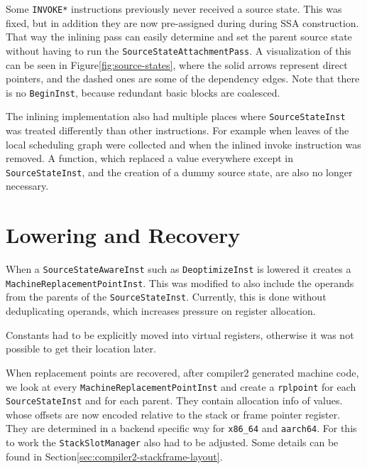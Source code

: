\documentclass[draft,final]{vutinfth} %
\begin{document}
    Some \lstinline{INVOKE*} instructions previously never received a source state.
    This was fixed,
    but in addition they are now pre-assigned during during SSA construction.
    That way the inlining pass can easily determine and set the parent source state
    without having to run the \lstinline{SourceStateAttachmentPass}.
    A visualization of this can be seen in Figure\ref{fig:source-states},
    where the solid arrows represent direct pointers,
    and the dashed ones are some of the dependency edges.
    Note that there is no \lstinline{BeginInst}, because redundant basic blocks are coalesced.


    The inlining implementation also had multiple places where \lstinline{SourceStateInst} was treated differently than other instructions.
    For example when leaves of the local scheduling graph were collected
    and when the inlined invoke instruction was removed.
    A function,
    which replaced a value everywhere except in \lstinline{SourceStateInst},
    and the creation of a dummy source state,
    are also no longer necessary.


    \section{Lowering and Recovery}

    When a \lstinline{SourceStateAwareInst} such as \lstinline{DeoptimizeInst} is lowered
    it creates a \lstinline{MachineReplacementPointInst}.
    This was modified to also include the operands from the parents of the \lstinline{SourceStateInst}.
    Currently, this is done without deduplicating operands,
    which increases pressure on register allocation.

    Constants had to be explicitly moved into virtual registers,
    otherwise it was not possible to get their location later.

    When replacement points are recovered,
    after compiler2 generated machine code,
    we look at every \lstinline{MachineReplacementPointInst}
    and create a \lstinline{rplpoint} for each \lstinline{SourceStateInst} and for each parent.
    They contain allocation info of values.
    whose offsets are now encoded relative to the stack or frame pointer
    register.
    They are determined in a backend specific way for \texttt{x86\_64} and \texttt{aarch64}.
    For this to work the \lstinline{StackSlotManager} also had to be adjusted.
    Some details can be found in Section\ref{sec:compiler2-stackframe-layout}.
\end{document}
